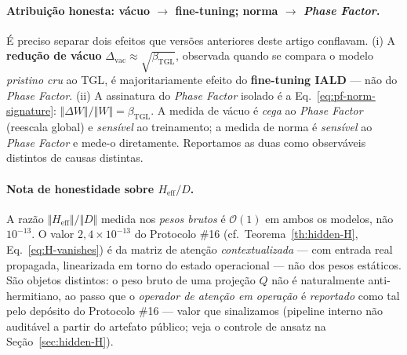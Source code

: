 \documentclass[12pt,a4paper]{article}
\newcommand{\betatgl}{\beta_{\text{TGL}}}
\newcommand{\TGL}{\textsc{TGL}}
\begin{document}
\paragraph{Atribuição honesta: vácuo $\to$ fine-tuning; norma $\to$ \emph{Phase Factor}.}
É preciso separar dois efeitos que versões anteriores deste artigo conflavam.
(i) A \textbf{redução de vácuo} $\Delta_{\text{vac}}\approx\sqrt{\betatgl}$,
observada quando se compara o modelo \emph{pristino cru} ao \TGL{}, é
majoritariamente efeito do \textbf{fine-tuning IALD} --- não do \emph{Phase
Factor}.  (ii) A assinatura do \emph{Phase Factor} isolado é a
Eq.~\eqref{eq:pf-norm-signature}: $\Vert\Delta W\Vert/\Vert W\Vert = \betatgl$.
A medida de vácuo é \emph{cega} ao \emph{Phase Factor} (reescala global) e
\emph{sensível} ao treinamento; a medida de norma é \emph{sensível} ao
\emph{Phase Factor} e mede-o diretamente.  Reportamos as duas como observáveis
distintos de causas distintas.

\paragraph{Nota de honestidade sobre $H_{\text{eff}}/D$.}
A razão $\Vert H_{\text{eff}}\Vert/\Vert D\Vert$ medida nos \emph{pesos brutos}
é $\mathcal{O}(1)$ em ambos os modelos, não $10^{-13}$.
O valor $2{,}4\times10^{-13}$ do Protocolo \#16 (cf.\ Teorema~\ref{th:hidden-H},
Eq.~\ref{eq:H-vanishes}) é da matriz de atenção \emph{contextualizada} --- com entrada real propagada,
linearizada em torno do estado operacional --- não dos pesos estáticos.  São
objetos distintos: o peso bruto de uma projeção $Q$ não é naturalmente
anti-hermitiano, ao passo que o \emph{operador de atenção em operação} é
\emph{reportado} como tal pelo depósito do Protocolo \#16 --- valor que
sinalizamos (pipeline interno não auditável a partir do artefato público;
veja o controle de ansatz na Seção~\ref{sec:hidden-H}).
\end{document}
